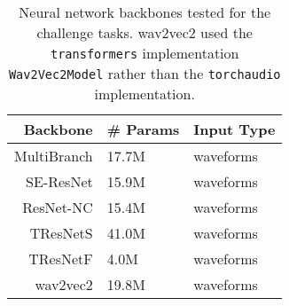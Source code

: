 
\begin{table}[!htp]
\centering
\begin{tabular}{r|l|l}
    \hline
    Backbone & \# Params & Input Type \\ \hline
    MultiBranch \cite{Kang_2022_cinc2021_iop} & 17.7M & waveforms \\
    SE-ResNet \cite{Kang_2022_cinc2021_iop} & 15.9M & waveforms  \\
    ResNet-NC \cite{ribeiro2020automatic} & 15.4M & waveforms  \\
    TResNetS \cite{Kang_2022_cinc2021_iop} & 41.0M & waveforms  \\
    TResNetF \cite{Kang_2022_cinc2021_iop} & 4.0M & waveforms  \\
    wav2vec2 \cite{baevski2020wav2vec} & 19.8M & waveforms \\ \hline
\end{tabular}
\caption{Neural network backbones tested for the challenge tasks. wav2vec2 used the \texttt{transformers} \protect\cite{wolf-etal-2020-transformers} implementation \texttt{Wav2Vec2Model} rather than the \texttt{torchaudio} implementation.}
\label{tab:nn_backbone}
\end{table}
